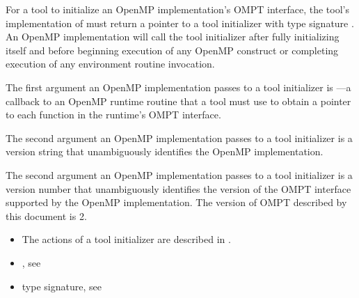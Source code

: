 \descr
For a tool to initialize an OpenMP implementation's OMPT interface,
the tool's implementation of  must return a 
pointer to a tool initializer with type signature .
An OpenMP implementation will call the tool initializer
after fully initializing itself and before 
beginning execution of any OpenMP construct
or completing execution of any environment routine invocation.  

\argdesc
The first argument an OpenMP implementation passes to a tool initializer 
is ---a callback 
to an OpenMP runtime routine that a tool must use to 
obtain a pointer to each function in the runtime's OMPT interface.

\begin{comment}
All functions in the OMPT interface are marked with \code{OMPT\_API}, which
indicates that the only way a tool can obtain bindings for them
is using the \plc{lookup} callback.

The \code{lookup} callback is necessary in the case when an OpenMP runtime 
is dynamically loaded by a shared library. In this case, 
OMPT interface functions provided by the library may 
not be visible to a preloaded tool.
\end{comment}

The second argument an OpenMP implementation passes to a tool initializer 
is a version string that unambiguously identifies the OpenMP implementation.

\begin{comment}
This argument is useful to tool developers trying to debug a statically-linked executable that contains both a tool implementation and an OpenMP implementation.
Knowing exactly what version of an OpenMP implementation is present 
may be helpful when diagnosing a problem, e.g., identifying an old runtime system that may be incompatible with a newer tool.
\end{comment}

The second argument an OpenMP implementation passes to a tool initializer 
is a version number that unambiguously identifies the version of the 
OMPT interface supported by the OpenMP implementation.  
The version of OMPT described by this document is 2.

\crossreferences
\begin{itemize}
\item The actions of a tool initializer are described in 
.
\item {}, see 
\item {} type signature, see 
\end{itemize}


